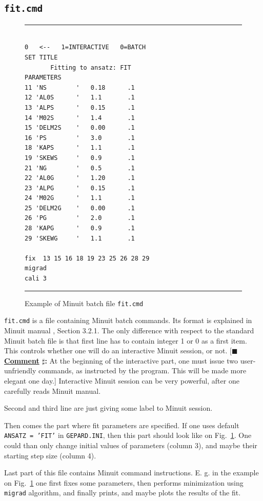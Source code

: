 \documentclass[12pt]{article}
\newcounter{comment}
\newcommand{\comminline}[1]{{%
\refstepcounter{comment}%
\ttfamily\small[$\blacksquare$ \textbf{\underline{Comment}
$\sharp$\thecomment:} #1]}}
\begin{document}
\subsection{\texttt{fit.cmd}}

\begin{figure}[t]
\begin{center}
\hrule
\begin{verbatim}

0   <--   1=INTERACTIVE   0=BATCH
SET TITLE
       Fitting to ansatz: FIT
PARAMETERS
11 'NS        '   0.18      .1  
12 'AL0S      '   1.1       .1   
13 'ALPS      '   0.15      .1  
14 'M02S      '   1.4       .1
15 'DELM2S    '   0.00      .1  
16 'PS        '   3.0       .1  
18 'KAPS      '   1.1       .1  
19 'SKEWS     '   0.9       .1  
21 'NG        '   0.5       .1  
22 'AL0G      '   1.20      .1   
23 'ALPG      '   0.15      .1  
24 'M02G      '   1.1       .1
25 'DELM2G    '   0.00      .1  
26 'PG        '   2.0       .1  
28 'KAPG      '   0.9       .1  
29 'SKEWG     '   1.1       .1  

fix  13 15 16 18 19 23 25 26 28 29
migrad
cali 3

\end{verbatim}
\hrule
\end{center}
\caption{Example of Minuit batch file \texttt{fit.cmd}}
\label{fig:fit.cmd}
\end{figure}

\texttt{fit.cmd} is a file containing Minuit batch commands. Its format is explained in
Minuit manual \cite{Minuit}, Section 3.2.1. The only difference with respect to the
standard Minuit batch file is that first line has to contain integer 1 or 0 as a first
item. This controls whether one will do an interactive Minuit session, or not.
\comminline{At the beginning of the interactive part, one must issue two user-unfriendly
commands, as instructed by the program. This will be made more elegant one day.}
Interactive Minuit session can be very powerful, after one carefully reads Minuit manual.

Second and third line are just giving some label to Minuit session.

Then comes the part where fit parameters are specified.
If one uses default \texttt{ANSATZ = 'FIT'} in
\texttt{GEPARD.INI}, then this part should look like on
Fig.~\ref{fig:fit.cmd}. One could than only change initial values of parameters
(column 3), and maybe their starting step size (column 4).

Last part of this file contains Minuit command instructions. E. g. in the
example on Fig.~\ref{fig:fit.cmd} one first fixes some parameters,
then performs minimization using \texttt{migrad} algorithm,
and finally prints, and maybe plots the results of the fit.
\end{document}
